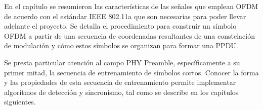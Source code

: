 En el capítulo se resumieron las características de las señales que emplean OFDM de acuerdo con el estándar \color{Red} IEEE 802.11a \color{black} que son necesarias para poder llevar adelante el proyecto. Se detalla el procedimiento para construir un símbolo OFDM a partir de una secuencia de coordenadas resultantes de una constelación de modulación y cómo estos símbolos se organizan para formar una PPDU.

Se presta particular atención al campo PHY Preamble, específicamente a su primer mitad, la secuencia de entrenamiento de símbolos cortos. Conocer la forma y las propiedades de esta secuencia de entrenamiento permite implementar algoritmos de detección y sincronismo, \color{Red} tal como se describe \color{black} en los capítulos siguientes.

